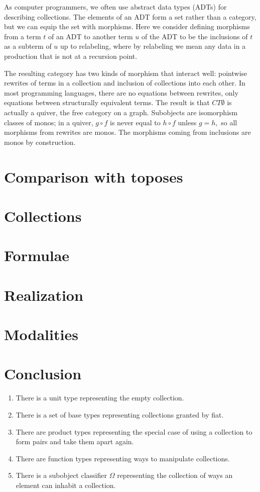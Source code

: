 \documentclass[sigplan,9pt,review,anonymous]{acmart}\settopmatter{printfolios=true,printccs=false,printacmref=false}
\begin{document}
As computer programmers, we often use abstract data types (ADTs) for describing collections.  The elements of an ADT form a set rather than a category, but we can equip the set with morphisms.  Here we consider defining morphisms from a term $t$ of an ADT to another term $u$ of the ADT to be the inclusions of $t$ as a subterm of $u$ up to relabeling, where by relabeling we mean any data in a production that is not at a recursion point.

The resulting category has two kinds of morphism that interact well: pointwise rewrites of terms in a collection and inclusion of collections into each other.  In most programming languages, there are no equations between rewrites, only equations between structurally equivalent terms.  The result is that $CT\emptyset$ is actually a quiver, the free category on a graph.  Subobjects are isomorphism classes of monos; in a quiver, $g\circ f$ is never equal to $h\circ f$ unless $g=h,$ so all morphisms from rewrites are monos.  The morphisms coming from inclusions are monos by construction.




\section{Comparison with toposes}



\section{Collections}
\section{Formulae}
\section{Realization}
\section{Modalities}
\section{Conclusion}

\begin{enumerate}
  \item \label{topostype:unit} There is a unit type representing the empty collection.
  \item \label{topostype:base} There is a set of base types representing collections granted by fiat.
  \item \label{topostype:product} There are product types representing the special case of using a collection to form pairs and take them apart again.
  \item \label{topostype:function} There are function types representing ways to manipulate collections.
  \item \label{topostype:omega} There is a subobject classifier $\Omega$ representing the collection of ways an element can inhabit a collection.
\end{enumerate}
\end{document}
